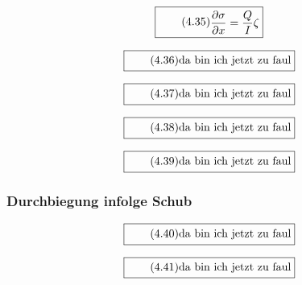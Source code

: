 \documentclass[11pt]{article}
\newcommand{\1}{ {\mathds{1}} }
\begin{document}
		\begin{equation}
			\boxed{
				\tag{4.35}
				\begin{split}
					\frac{\partial \sigma}{\partial x} = \frac{Q}{I} \zeta
				\end{split}
			}
		\end{equation}

		\begin{equation}
			\boxed{
				\tag{4.36}
				\begin{split}
					\text{da bin ich jetzt zu faul}
				\end{split}
			}
		\end{equation}

		\begin{equation}
			\boxed{
				\tag{4.37}
				\begin{split}
					\text{da bin ich jetzt zu faul}
				\end{split}
			}
		\end{equation}

		\begin{equation}
			\boxed{
				\tag{4.38}
				\begin{split}
					\text{da bin ich jetzt zu faul}
				\end{split}
			}
		\end{equation}

		\begin{equation}
			\boxed{
				\tag{4.39}
				\begin{split}
					\text{da bin ich jetzt zu faul}
				\end{split}
			}
		\end{equation}
		
		\subsubsection{Durchbiegung infolge Schub}

		\begin{equation}
			\boxed{
				\tag{4.40}
				\begin{split}
					\text{da bin ich jetzt zu faul}
				\end{split}
			}
		\end{equation}

		\begin{equation}
			\boxed{
				\tag{4.41}
				\begin{split}
					\text{da bin ich jetzt zu faul}
				\end{split}
			}
		\end{equation}
\end{document}
